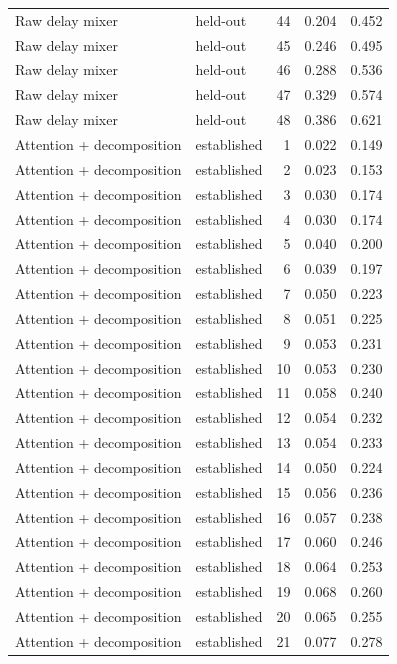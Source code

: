 \begin{tabular}{llrrr}
Raw delay mixer & held-out & 44 & 0.204 & 0.452 \\
Raw delay mixer & held-out & 45 & 0.246 & 0.495 \\
Raw delay mixer & held-out & 46 & 0.288 & 0.536 \\
Raw delay mixer & held-out & 47 & 0.329 & 0.574 \\
Raw delay mixer & held-out & 48 & 0.386 & 0.621 \\
Attention + decomposition & established & 1 & 0.022 & 0.149 \\
Attention + decomposition & established & 2 & 0.023 & 0.153 \\
Attention + decomposition & established & 3 & 0.030 & 0.174 \\
Attention + decomposition & established & 4 & 0.030 & 0.174 \\
Attention + decomposition & established & 5 & 0.040 & 0.200 \\
Attention + decomposition & established & 6 & 0.039 & 0.197 \\
Attention + decomposition & established & 7 & 0.050 & 0.223 \\
Attention + decomposition & established & 8 & 0.051 & 0.225 \\
Attention + decomposition & established & 9 & 0.053 & 0.231 \\
Attention + decomposition & established & 10 & 0.053 & 0.230 \\
Attention + decomposition & established & 11 & 0.058 & 0.240 \\
Attention + decomposition & established & 12 & 0.054 & 0.232 \\
Attention + decomposition & established & 13 & 0.054 & 0.233 \\
Attention + decomposition & established & 14 & 0.050 & 0.224 \\
Attention + decomposition & established & 15 & 0.056 & 0.236 \\
Attention + decomposition & established & 16 & 0.057 & 0.238 \\
Attention + decomposition & established & 17 & 0.060 & 0.246 \\
Attention + decomposition & established & 18 & 0.064 & 0.253 \\
Attention + decomposition & established & 19 & 0.068 & 0.260 \\
Attention + decomposition & established & 20 & 0.065 & 0.255 \\
Attention + decomposition & established & 21 & 0.077 & 0.278 \\

\end{tabular}
